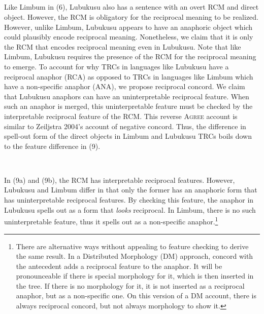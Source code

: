 \setcounter{listWWviiiNumxlileveli}{0}
\begin{listWWviiiNumxlileveli}
\item \ea\label{ex:}
\\
\ea\label{ex:}
\\
\ea\label{ex:}
\\
\ea\label{ex:}
\\
\end{listWWviiiNumxlileveli}

Like Limbum in (6), Lubukusu also has a sentence with an overt RCM and direct object. However, the RCM is obligatory for the reciprocal meaning to be realized. However, unlike Limbum, Lubukusu appears to have an anaphoric object which could plausibly encode reciprocal meaning. Nonetheless, we claim that it is only the RCM that encodes reciprocal meaning even in Lubukusu. Note that like Limbum, Lubukusu requires the presence of the RCM for the reciprocal meaning to emerge. To account for why TRCs in languages like Lubukusu have a reciprocal anaphor (RCA) as opposed to TRCs in languages like Limbum which have a non-specific anaphor (ANA), we propose reciprocal concord. We claim that Lubukusu anaphors can have an uninterpretable reciprocal feature. When such an anaphor is merged, this uninterpretable feature must be checked by the interpretable reciprocal feature of the RCM. This reverse \textsc{Agree} account is similar to Zeiljstra 2004's account of negative concord. Thus, the difference in spell-out form of the direct objects in Limbum and Lubukusu TRCs boils down to the feature difference in (9).

\begin{listWWviiiNumxlileveli}
\item \ea\label{ex:}
\\
\end{listWWviiiNumxlileveli}

In (9a) and (9b), the RCM has interpretable reciprocal features. However, Lubukusu and Limbum differ in that only the former has an anaphoric form that has uninterpretable reciprocal features. By checking this feature, the anaphor in Lubukusu spells out as a form that \textit{looks} reciprocal. In Limbum, there is no such uninterpretable feature, thus it spells out as a non-specific anaphor.\footnote{ There are alternative ways without appealing to feature checking to derive the same result. In a Distributed Morphology (DM) approach, concord with the antecedent adds a reciprocal feature to the anaphor. It will be pronounceable if there is special morphology for it, which is then inserted in the tree. If there is no morphology for it, it is not inserted as a reciprocal anaphor, but as a non-specific one. On this version of a DM account, there is always reciprocal concord, but not always morphology to show it. }

